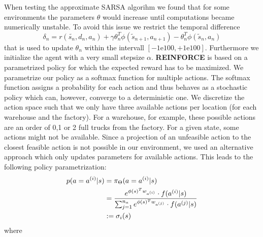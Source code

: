 \documentclass[journal, a4paper]{IEEEtran}
\theoremstyle{plain}
\theoremstyle{definition}
\begin{document}
When testing the approximate SARSA algorihm we found that for some environments the parameters $\theta$ would increase until computations became numerically unstable. To avoid this issue we restrict the temporal difference
\begin{equation}
	\delta_n = r(\tilde{s_n}, d_n, a_n) + \gamma \theta_n^T \phi(\tilde{s}_{n+1}, a_{n+1}) - \theta_n^T\phi(\tilde{s}_n, a_n)
\end{equation}
that is used to update $\theta_n$ within the intervall $[-1\mathrm{e}{100}, +1\mathrm{e}{100}]$. Furthermore we initialize the agent with a very small stepsize $\alpha$. 
\newline
\textbf{REINFORCE} is based on a parametrized policy for which the expected reward has to be maximized. We parametrize our policy as a softmax function for multiple actions. The softmax function assigns a probability for each action and thus behaves as a stochastic policy which can, however, converge to a deterministic one. 
We discretize the action space such that we only have three available actions per location (for each warehouse and the factory). For a warehouse, for example, these possible actions are an order of  0,1 or 2 full trucks from the factory. For a given state, some actions might not be available. Since a projection of an unfeasible action to the closest feasible action is not possible in our environment, we used an alternative approach which only updates parameters for available actions. 
This leads to the following policy parametrization:
\begin{equation}
    \label{simple_equation}
    \begin{split}
    p( a = a^{(i)}| s)& =  \pi_\Theta(a = a^{(i)}|s) 
    \notag
    \\
     & =\frac{e^{\phi(s)^T w_{a^{(i)}}}\cdot f(a^{(i)}|s)}{\sum_{j=1}^{n_a} e^{\phi(s)^T w_{a^{(j)}}}\cdot f(a^{(j)}|s)}\\ 
     & :=
     \sigma_i(s)
     \end{split}
\end{equation}
where 
\end{document}
